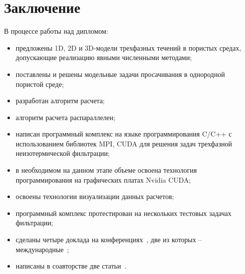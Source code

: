 \section{Заключение}

В процессе работы над дипломом:

\begin{itemize}
	\item 	предложены 1D, 2D и 3D-модели трехфазных течений в пористых средах,
	допускающие реализацию явными численными методами;

	\item поставлены и решены модельные задачи просачивания в однородной 
	пористой среде;

	\item разработан алгоритм расчета;
	
	\item алгоритм расчета распараллелен;
	
	\item написан программный комплекс на языке программирования C/C++ с использованием 
	библиотек MPI, CUDA для решения задач трехфазной неизотермической фильтрации;
	
	\item в необходимом на данном этапе объеме освоена технология 
	программирования на графических платах Nvidia CUDA;

	\item освоены технологии визуализации данных расчетов;

	\item программный комплекс протестирован на нескольких тестовых задачах 
	фильтрации;
	
	\item сделаны четыре доклада на конференциях~, две из которых -- международные~;

	\item написаны в соавторстве две статьи~.
\end{itemize}
